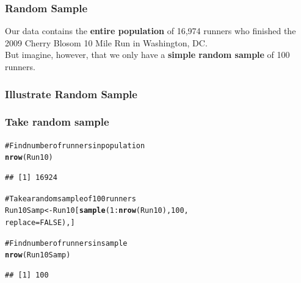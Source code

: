 \documentclass{beamer}\usepackage{graphicx, color}
\makeatletter
\newcommand{\hlfunctioncall}[1]{\textcolor[rgb]{0.501960784313725,0,0.329411764705882}{\textbf{#1}}}%
\newcommand{\hlcomment}[1]{\textcolor[rgb]{0.180392156862745,0.6,0.341176470588235}{#1}}%
\newenvironment{kframe}{%
 \def\at@end@of@kframe{}%
 \ifinner\ifhmode%
  \def\at@end@of@kframe{\end{minipage}}%
  \begin{minipage}{\columnwidth}%
 \fi\fi%
 \def\FrameCommand##1{\hskip\@totalleftmargin \hskip-\fboxsep
 \colorbox{shadecolor}{##1}\hskip-\fboxsep
     \hskip-\linewidth \hskip-\@totalleftmargin \hskip\columnwidth}%
 \MakeFramed {\advance\hsize-\width
   \@totalleftmargin\z@ \linewidth\hsize
   \@setminipage}}%
 {\par\unskip\endMakeFramed%
 \at@end@of@kframe}
\newenvironment{knitrout}{}{} %
\makeatother
\begin{document}
\begin{frame}[fragile]
  \frametitle{Random Sample}
{\large{Our data contains the {\bf{entire population}} of 16,974 runners who finished the 2009 Cherry Blosom 10 Mile Run in Washington, DC. \\[0.5cm]
  But imagine, however, that we only have a {\bf{simple random sample}} of 100 runners.}}
\end{frame}

\begin{frame}[fragile]
  \frametitle{Illustrate Random Sample}
\begin{knitrout}
\color{fgcolor}

{\centering {}

}


\end{knitrout}

\end{frame}

\begin{frame}[fragile]
  \frametitle{Take random sample}
\begin{knitrout}
\color{fgcolor}\begin{kframe}
\begin{alltt}
\hlcomment{# Find number of runners in population}
\hlfunctioncall{nrow}(Run10)
\end{alltt}
\begin{verbatim}
## [1] 16924
\end{verbatim}
\begin{alltt}

\hlcomment{# Take a random sample of 100 runners}
Run10Samp <- Run10[\hlfunctioncall{sample}(1:\hlfunctioncall{nrow}(Run10), 100,
                          replace=FALSE),]

\hlcomment{# Find number of runners in sample}
\hlfunctioncall{nrow}(Run10Samp)
\end{alltt}
\begin{verbatim}
## [1] 100
\end{verbatim}
\end{kframe}
\end{knitrout}

\end{frame}
\end{document}
